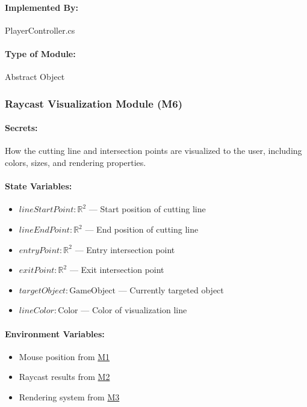 \documentclass[12pt, titlepage]{article}
\begin{document}
\paragraph{Implemented By:}
PlayerController.cs

\paragraph{Type of Module:}
Abstract Object

\vspace{10mm}

\subsubsection{Raycast Visualization Module (M6)} \label{M6}

\paragraph{Secrets:}
How the cutting line and intersection points are visualized to the user, including colors, sizes, and rendering properties.

\paragraph{State Variables:}
\begin{itemize}
\item $lineStartPoint : \mathbb{R}^2$ --- Start position of cutting line
\item $lineEndPoint : \mathbb{R}^2$ --- End position of cutting line
\item $entryPoint : \mathbb{R}^2$ --- Entry intersection point
\item $exitPoint : \mathbb{R}^2$ --- Exit intersection point
\item $targetObject : \text{GameObject}$ --- Currently targeted object
\item $lineColor : \text{Color}$ --- Color of visualization line
\end{itemize}

\paragraph{Environment Variables:}
\begin{itemize}
\item Mouse position from \hyperref[M1]{M1}
\item Raycast results from \hyperref[M2]{M2}
\item Rendering system from \hyperref[M3]{M3}
\end{itemize}
\end{document}
